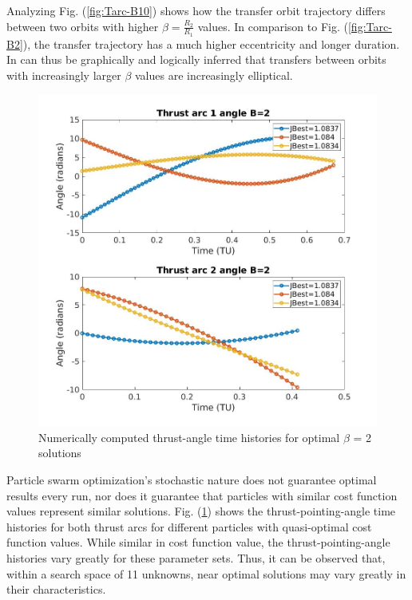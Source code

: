 \noindent Analyzing Fig. (\ref{fig:Tarc-B10}) shows how the transfer orbit trajectory differs between two orbits 
with higher $\beta = \frac{R_2}{R_1}$ values. In comparison to Fig. (\ref{fig:Tarc-B2}), the transfer trajectory has
a much higher eccentricity and longer duration. In can thus be graphically and logically inferred that transfers between orbits 
with increasingly larger $\beta$ values are increasingly elliptical.

\begin{figure}[H]
\includegraphics[width=\linewidth]{./jpgs/thrustAnglesB2.jpg}
\caption{Numerically computed thrust-angle time histories for optimal $\beta$ = 2 solutions  }
\label{fig:thrustAnglesB2}
\end{figure}

\noindent Particle swarm optimization's stochastic nature does not guarantee optimal results every 
run, nor does it guarantee that particles with similar cost function values represent similar solutions. 
Fig. (\ref{fig:thrustAnglesB2}) shows the thrust-pointing-angle time histories for both thrust arcs for 
different particles with quasi-optimal cost function values. While similar in cost function value, the 
thrust-pointing-angle histories vary greatly for these parameter sets. Thus, it can be observed that, within a search 
space of 11 unknowns, near optimal solutions may vary greatly in their characteristics.

